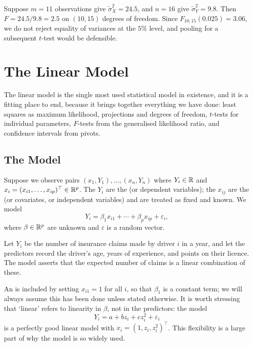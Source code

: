 \documentclass[a4paper]{scrartcl}
\begin{document}
\begin{example}
  Suppose $m = 11$ observations give $\tilde\sigma_X^2 = 24.5$, and $n = 16$ give $\tilde\sigma_Y^2 = 9.8$. Then $F = 24.5/9.8 = 2.5$ on $(10, 15)$ degrees of freedom. Since $F_{10,15}(0.025) = 3.06$, we do not reject equality of variances at the $5\%$ level, and pooling for a subsequent $t$-test would be defensible.
\end{example}


\section{The Linear Model}

The linear model is the single most used statistical model in existence, and it is a fitting place to end, because it brings together everything we have done: least squares as maximum likelihood, projections and degrees of freedom, $t$-tests for individual parameters, $F$-tests from the generalised likelihood ratio, and confidence intervals from pivots.

\subsection{The Model}

Suppose we observe pairs $(x_1, Y_1),\dots,(x_n,Y_n)$ where $Y_i \in \mathbb{R}$ and $x_i = (x_{i1},\dots,x_{ip})^\top\in\mathbb{R}^p$. The $Y_i$ are the  (or dependent variables); the $x_{ij}$ are the  (or covariates, or independent variables) and are treated as fixed and known. We model
$$
Y_i = \beta_1 x_{i1} + \cdots + \beta_p x_{ip} + \varepsilon_i,
$$
where $\beta \in \mathbb{R}^p$ are unknown  and $\varepsilon$ is a random  vector.

\begin{example}
  Let $Y_i$ be the number of insurance claims made by driver $i$ in a year, and let the predictors record the driver's age, years of experience, and points on their licence. The model asserts that the expected number of claims is a linear combination of these.
\end{example}

An  is included by setting $x_{i1} = 1$ for all $i$, so that $\beta_1$ is a constant term; we will always assume this has been done unless stated otherwise. It is worth stressing that `linear' refers to linearity in $\beta$, not in the predictors: the model
$$
Y_i = a + bz_i + cz_i^2 + \varepsilon_i
$$
is a perfectly good linear model with $x_i = (1, z_i, z_i^2)^\top$. This flexibility is a large part of why the model is so widely used.
\end{document}
